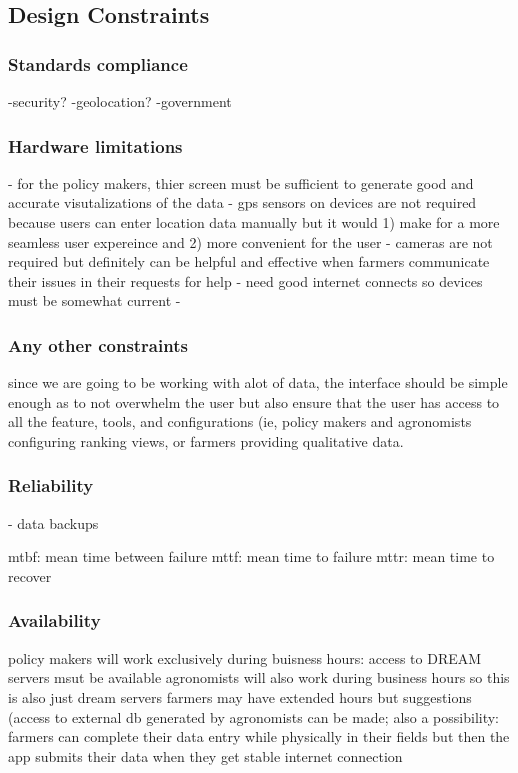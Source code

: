 \subsection{Design Constraints}




\subsubsection{Standards compliance}
-security?
-geolocation?
-government 
\subsubsection{Hardware limitations}
- for the policy makers, thier screen must be sufficient to generate good and accurate visutalizations of the data
- gps sensors on devices are not required because users can enter location data manually but it would 1) make for a more seamless user expereince and 2) more convenient for the user
- cameras are not required but definitely can be helpful and effective when farmers communicate their issues in their requests for help
- need good internet connects so devices must be somewhat current 
- 

\subsubsection{Any other constraints}
since we are going to be working with alot of data, the interface should be simple enough as to not overwhelm the user but also ensure that the user has access to all the feature, tools, and configurations (ie, policy makers and agronomists configuring ranking views, or farmers providing qualitative data. 



\subsubsection{Reliability}
- data backups 


mtbf: mean time between failure
mttf: mean time to failure
mttr: mean time to recover
\subsubsection{Availability}
policy makers will work exclusively during buisness hours: access to DREAM servers msut be available
agronomists will also work during business hours so this is also just dream servers
farmers may have extended hours but suggestions (access to external db generated by agronomists can be made; also a possibility: farmers can complete their data entry while physically in their fields but then the app submits their data when they get stable internet connection

